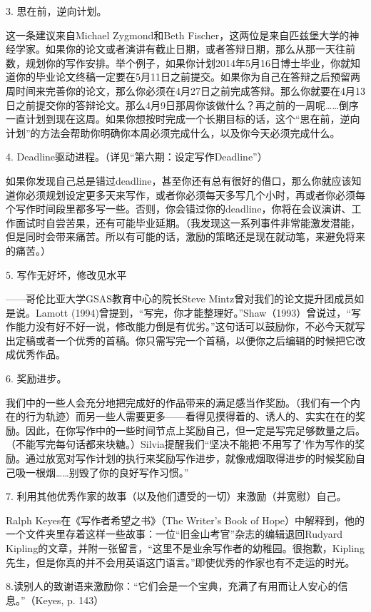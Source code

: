 \documentclass{ctexart}
\begin{document}
3. 思在前，逆向计划。

这一条建议来自Michael Zygmond和Beth Fischer，这两位是来自匹兹堡大学的神经学家。如果你的论文或者演讲有截止日期，或者答辩日期，那么从那一天往前数，规划你的写作安排。举个例子，如果你计划2014年5月16日博士毕业，你就知道你的毕业论文终稿一定要在5月11日之前提交。如果你为自己在答辩之后预留两周时间来完善你的论文，那么你必须在4月27日之前完成答辩。那么你就要在4月13日之前提交你的答辩论文。那么4月9日那周你该做什么？再之前的一周呢……倒序一直计划到现在这周。如果你想按时完成一个长期目标的话，这个“思在前，逆向计划”的方法会帮助你明确你本周必须完成什么，以及你今天必须完成什么。

4. Deadline驱动进程。（详见“第六期：设定写作Deadline”）

如果你发现自己总是错过deadline，甚至你还有总有很好的借口，那么你就应该知道你必须规划设定更多天来写作，或者你必须每天多写几个小时，再或者你必须每个写作时间段里都多写一些。否则，你会错过你的deadline，你将在会议演讲、工作面试时自尝苦果，还有可能毕业延期。（我发现这一系列事件非常能激发潜能，但是同时会带来痛苦。所以有可能的话，激励的策略还是现在就动笔，来避免将来的痛苦。）

5. 写作无好坏，修改见水平

——哥伦比亚大学GSAS教育中心的院长Steve Mintz曾对我们的论文提升团成员如是说。Lamott (1994)曾提到，“写完，你才能整理好。”Shaw（1993）曾说过，“写作能力没有好不好一说，修改能力倒是有优劣。”这句话可以鼓励你，不必今天就写出定稿或者一个优秀的首稿。你只需写完一个首稿，以便你之后编辑的时候把它改成优秀作品。

6. 奖励进步。

我们中的一些人会充分地把完成好的作品带来的满足感当作奖励。（我们有一个内在的行为轨迹）而另一些人需要更多——看得见摸得着的、诱人的、实实在在的奖励。因此，在你写作中的一些时间节点上奖励自己，但一定是写完足够数量之后。（不能写完每句话都来块糖。）Silvia提醒我们“坚决不能把‘不用写了’作为写作的奖励。通过放宽对写作计划的执行来奖励写作进步，就像戒烟取得进步的时候奖励自己吸一根烟……别毁了你的良好写作习惯。”

7. 利用其他优秀作家的故事（以及他们遭受的一切）来激励（并宽慰）自己。

Ralph Keyes在《写作者希望之书》（The Writer's Book of Hope）中解释到，他的一个文件夹里存着这样一些故事：一位“旧金山考官”杂志的编辑退回Rudyard Kipling的文章，并附一张留言，“这里不是业余写作者的幼稚园。很抱歉，Kipling先生，但是你真的并不会用英语这门语言。”即使优秀的作家也有不走运的时光。

8.读别人的致谢语来激励你：“它们会是一个宝典，充满了有用而让人安心的信息。”（Keyes, p. 143）
\end{document}
